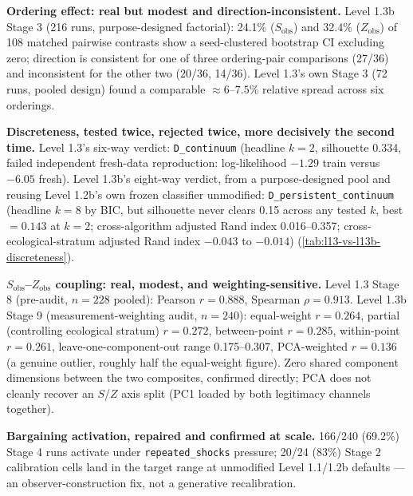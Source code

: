 \textbf{Ordering effect: real but modest and direction-inconsistent.}
Level 1.3b Stage 3 (216 runs, purpose-designed factorial): 24.1\%
($S_{\text{obs}}$) and 32.4\% ($Z_{\text{obs}}$) of 108 matched pairwise
contrasts show a seed-clustered bootstrap CI excluding zero; direction is
consistent for one of three ordering-pair comparisons (27/36) and
inconsistent for the other two (20/36, 14/36). Level 1.3's own Stage 3 (72
runs, pooled design) found a comparable $\approx6$--$7.5\%$ relative
spread across six orderings.

\textbf{Discreteness, tested twice, rejected twice, more decisively the
second time.} Level 1.3's six-way verdict: \texttt{D\_continuum} (headline
$k{=}2$, silhouette 0.334, failed independent fresh-data reproduction:
log-likelihood $-1.29$ train versus $-6.05$ fresh). Level 1.3b's
eight-way verdict, from a purpose-designed pool and reusing Level 1.2b's
own frozen classifier unmodified: \texttt{D\_persistent\_continuum}
(headline $k{=}8$ by BIC, but silhouette never clears 0.15 across any
tested $k$, best $=0.143$ at $k{=}2$; cross-algorithm adjusted Rand index
0.016--0.357; cross-ecological-stratum adjusted Rand index $-0.043$ to
$-0.014$) (\cref{tab:l13-vs-l13b-discreteness}).

\textbf{$S_{\text{obs}}$--$Z_{\text{obs}}$ coupling: real, modest, and
weighting-sensitive.} Level 1.3 Stage 8 (pre-audit, $n=228$ pooled): Pearson
$r=0.888$, Spearman $\rho=0.913$. Level 1.3b Stage 9 (measurement-weighting
audit, $n=240$): equal-weight $r=0.264$, partial (controlling ecological
stratum) $r=0.272$, between-point $r=0.285$, within-point $r=0.261$,
leave-one-component-out range 0.175--0.307, PCA-weighted $r=0.136$ (a
genuine outlier, roughly half the equal-weight figure). Zero shared
component dimensions between the two composites, confirmed directly; PCA
does not cleanly recover an $S$/$Z$ axis split (PC1 loaded by both
legitimacy channels together).

\textbf{Bargaining activation, repaired and confirmed at scale.} 166/240
(69.2\%) Stage 4 runs activate under \texttt{repeated\_shocks} pressure;
20/24 (83\%) Stage 2 calibration cells land in the target range at
unmodified Level 1.1/1.2b defaults --- an observer-construction fix, not a
generative recalibration.

\begin{table}[htbp]
\centering
\caption{Discreteness testing, Level 1.3 versus Level 1.3b: both verdicts
reject discrete institutional families, reached via Level 1.2b's own
frozen classifier reused unmodified at both milestones.}
\label{tab:l13-vs-l13b-discreteness}
\end{table}

